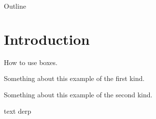 


\begin{frame}
  \titlepage
\end{frame}

\begin{frame}{Outline}
  \tableofcontents
\end{frame}

\section{Introduction}

\begin{frame}{How to use boxes.}
\begin{blueblock}
  Something about this example of the first kind.
\end{blueblock}
\begin{orangeblock}
  Something about this example of the second kind.
\end{orangeblock}
\textcolor{ReneOrange}{text} derp

\end{frame}

 